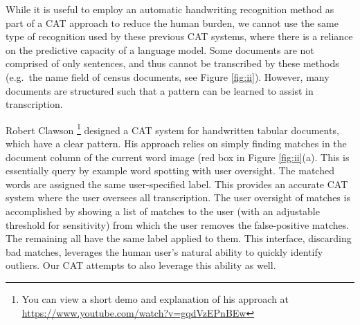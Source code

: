 \documentclass[ms,electronic,twosidetoc,letterpaper,chaptercenter,parttop,lof,lot]{byumsphd}
\begin{document}
While it is useful to employ an automatic handwriting recognition method as part of a CAT approach to reduce the human burden, we cannot use the same type of recognition used by these previous CAT systems, where there is a reliance on the predictive capacity of a language model. Some documents are not comprised of only sentences, and thus cannot be transcribed by these methods (e.g.~the name field of census documents, see Figure \ref{fig:ii}). However, many documents are structured such that a pattern can be learned to assist in transcription.


Robert Clawson \cite{Clawson2014}\footnote{You can view a short demo and explanation of his approach at \url{https://www.youtube.com/watch?v=gqdVzEPnBEw}} designed a CAT system for handwritten tabular documents, which have a clear pattern. His approach relies on simply finding matches in the document column of the current word image (red box in Figure \ref{fig:ii}(a). This is essentially query by example word spotting with user oversight. The matched words are assigned the same user-specified label. This provides an accurate CAT system where the user oversees all transcription. The user oversight of matches is accomplished by showing a list of matches to the user (with an adjustable threshold for sensitivity) from which the user removes the false-positive matches. The remaining all have the same label applied to them. This interface, discarding bad matches, leverages the human user's natural ability to quickly identify outliers.
Our CAT attempts to also leverage this ability as well.
\end{document}
